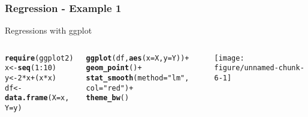 \documentclass{beamer}\usepackage[]{graphicx}\usepackage[]{color}
\makeatletter
\newcommand{\hlnum}[1]{\textcolor[rgb]{0.686,0.059,0.569}{#1}}%
\newcommand{\hlstr}[1]{\textcolor[rgb]{0.192,0.494,0.8}{#1}}%
\newcommand{\hlopt}[1]{\textcolor[rgb]{0,0,0}{#1}}%
\newcommand{\hlstd}[1]{\textcolor[rgb]{0.345,0.345,0.345}{#1}}%
\newcommand{\hlkwb}[1]{\textcolor[rgb]{0.69,0.353,0.396}{#1}}%
\newcommand{\hlkwc}[1]{\textcolor[rgb]{0.333,0.667,0.333}{#1}}%
\newcommand{\hlkwd}[1]{\textcolor[rgb]{0.737,0.353,0.396}{\textbf{#1}}}%
\newenvironment{kframe}{%
 \def\at@end@of@kframe{}%
 \ifinner\ifhmode%
  \def\at@end@of@kframe{\end{minipage}}%
  \begin{minipage}{\columnwidth}%
 \fi\fi%
 \def\FrameCommand##1{\hskip\@totalleftmargin \hskip-\fboxsep
 \colorbox{shadecolor}{##1}\hskip-\fboxsep
     \hskip-\linewidth \hskip-\@totalleftmargin \hskip\columnwidth}%
 \MakeFramed {\advance\hsize-\width
   \@totalleftmargin\z@ \linewidth\hsize
   \@setminipage}}%
 {\par\unskip\endMakeFramed%
 \at@end@of@kframe}
\newenvironment{knitrout}{}{} %
\makeatother
\begin{document}
\begin{frame}[fragile] \frametitle{Regression - Example 1}

Regressions with ggplot

\begin{columns}[c]

\begin{knitrout}
\color{fgcolor}\begin{kframe}
\begin{alltt}
\hlkwd{require}\hlstd{(ggplot2)}
\hlstd{x} \hlkwb{<-} \hlkwd{seq}\hlstd{(}\hlnum{1}\hlopt{:}\hlnum{10}\hlstd{)}
\hlstd{y} \hlkwb{<-} \hlnum{2}\hlopt{*}\hlstd{x} \hlopt{+}\hlstd{(x}\hlopt{*}\hlstd{x)}
\hlstd{df} \hlkwb{<-} \hlkwd{data.frame}\hlstd{(}\hlkwc{X}\hlstd{=x,}
                 \hlkwc{Y}\hlstd{=y)}
\end{alltt}
\end{kframe}
\end{knitrout}


\begin{knitrout}
\color{fgcolor}\begin{kframe}
\begin{alltt}
\hlkwd{ggplot}\hlstd{(df,} \hlkwd{aes}\hlstd{(}\hlkwc{x} \hlstd{= X,} \hlkwc{y} \hlstd{= Y))} \hlopt{+}
  \hlkwd{geom_point}\hlstd{()} \hlopt{+}
  \hlkwd{stat_smooth}\hlstd{(}\hlkwc{method} \hlstd{=} \hlstr{"lm"}\hlstd{,}
              \hlkwc{col} \hlstd{=} \hlstr{"red"}\hlstd{)} \hlopt{+}
    \hlkwd{theme_bw}\hlstd{()}
\end{alltt}


{\ttfamily\noindent\itshape{}}\end{kframe}
\texttt{[image: figure/unnamed-chunk-6-1]} 

\end{knitrout}

\end{columns}
\end{frame}

\end{document}
